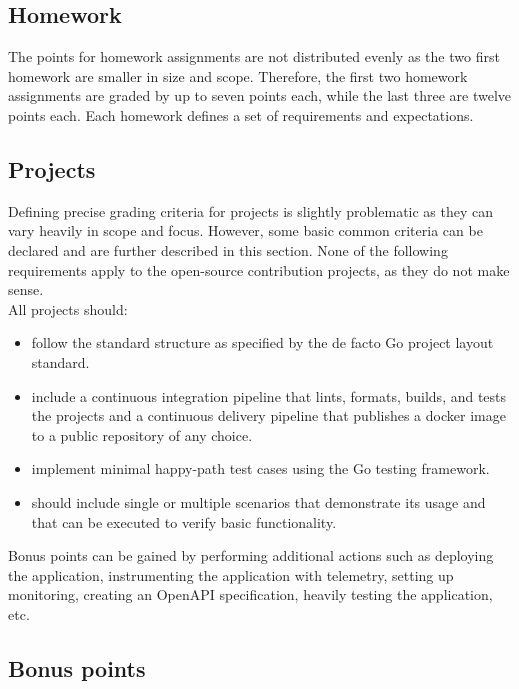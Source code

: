 \documentclass[
  digital,
  color,
  oneside,
  nosansbold,
  nocolorbold,
  nolof,
  nolot,
]{fithesis4}
\begin{document}
\subsection{Homework}

The points for homework assignments are not distributed evenly as the two first homework are smaller in size and scope. Therefore, the first two homework assignments are graded by up to seven points each, while the last three are twelve points each. Each homework defines a set of requirements and expectations.

\subsection{Projects}

Defining precise grading criteria for projects is slightly problematic as they can vary heavily in scope and focus. However, some basic common criteria can be declared and are further described in this section. None of the following requirements apply to the open-source contribution projects, as they do not make sense. \\

\noindent
All projects should:
\begin{itemize}
    \item follow the standard structure as specified by the de facto Go project layout standard\cite{go-project-layout}.
    \item include a continuous integration pipeline that lints, formats, builds, and tests the projects and a continuous delivery pipeline that publishes a docker image to a public repository of any choice.
    \item implement minimal happy-path test cases using the Go testing framework.
    \item should include single or multiple scenarios that demonstrate its usage and that can be executed to verify basic functionality.
\end{itemize}

\noindent
Bonus points can be gained by performing additional actions such as deploying the application, instrumenting the application with telemetry, setting up monitoring, creating an OpenAPI specification, heavily testing the application, etc.

\subsection{Bonus points}
\end{document}
